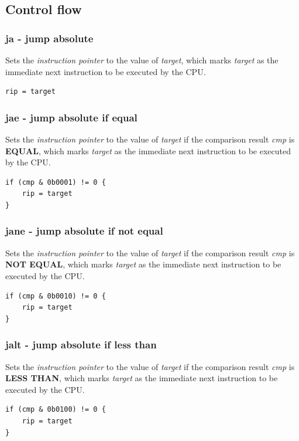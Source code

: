 \documentclass[a4paper,10pt]{article}
\begin{document}
\subsection{Control flow}
\subsubsection{ja - jump absolute}
	{Sets the \emph{instruction pointer} to the value of \emph{target}, which marks \emph{target} as the immediate next instruction to be executed by the CPU.}
\begin{lstlisting}
rip = target
\end{lstlisting}

\subsubsection{jae - jump absolute if equal}
	{Sets the \emph{instruction pointer} to the value of \emph{target} if the comparison result \emph{cmp} is \textbf{EQUAL}, which marks \emph{target} as the immediate next instruction to be executed by the CPU.}
\begin{lstlisting}
if (cmp & 0b0001) != 0 {
	rip = target
}
\end{lstlisting}

\subsubsection{jane - jump absolute if not equal}
	{Sets the \emph{instruction pointer} to the value of \emph{target} if the comparison result \emph{cmp} is \textbf{NOT EQUAL}, which marks \emph{target} as the immediate next instruction to be executed by the CPU.}
\begin{lstlisting}
if (cmp & 0b0010) != 0 {
	rip = target
}
\end{lstlisting}

\subsubsection{jalt - jump absolute if less than}
	{Sets the \emph{instruction pointer} to the value of \emph{target} if the comparison result \emph{cmp} is \textbf{LESS THAN}, which marks \emph{target} as the immediate next instruction to be executed by the CPU.}
\begin{lstlisting}
if (cmp & 0b0100) != 0 {
	rip = target
}
\end{lstlisting}
\end{document}
